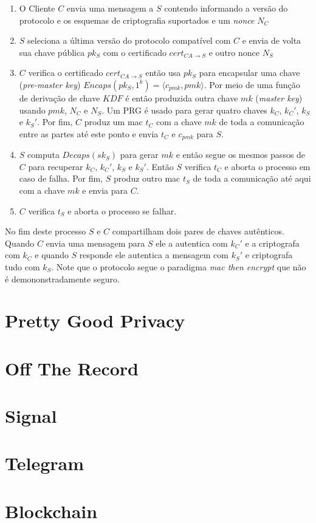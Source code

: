 \begin{enumerate}
\item O Cliente $C$ envia uma mensagem a $S$ contendo informando a versão do protocolo e os esquemas de criptografia suportados e um {\em nonce} $N_C$
\item $S$ seleciona a última versão do protocolo compatível com $C$ e envia de volta sua chave pública $pk_S$ com o certificado $cert_{CA \to S}$ e outro nonce $N_S$
\item $C$ verifica o certificado $cert_{CA \to S}$ então usa $pk_S$ para encapsular uma chave ({\em pre-master key}) $Encaps(pk_S, 1^k) = \langle c_{pmk}, pmk \rangle$.
  Por meio de uma função de derivação de chave $KDF$ é então produzida outra chave $mk$ ({\em master key}) usando $pmk$, $N_C$ e $N_S$.
Um PRG é usado para gerar quatro chaves $k_C$, $k_C'$, $k_S$ e $k_S'$.
Por fim, $C$ produz um mac $t_C$ com a chave $mk$ de toda a comunicação entre as partes até este ponto e envia $t_C$ e $c_{pmk}$ para $S$.
\item $S$ computa $Decaps(sk_S)$ para gerar $mk$ e então segue os mesmos passos de $C$ para recuperar $k_C$, $k_C'$, $k_S$ e $k_S'$.
Então $S$ verifica $t_C$ e aborta o processo em caso de falha.
Por fim, $S$ produz outro mac $t_S$ de toda a comunicação até aqui com a chave $mk$ e envia para $C$.
\item $C$ verifica $t_S$ e aborta o processo se falhar.
\end{enumerate}


No fim deste processo $S$ e $C$ compartilham dois pares de chaves autênticos.
Quando $C$ envia uma mensagem para $S$ ele a autentica com $k_C'$ e a criptografa com $k_C$ e quando $S$ responde ele autentica a mensagem com $k_S'$ e criptografa tudo com $k_S$.
Note que o protocolo segue o paradigma {\em mac then encrypt} que não é demononstradamente seguro.


\section{Pretty Good Privacy}
\label{sec:pgp}

\section{Off The Record}
\label{sec:otr}

\section{Signal}
\label{sec:signal}

\section{Telegram}
\label{sec:telegram}

\section{Blockchain}
\label{sec:blockchain}


